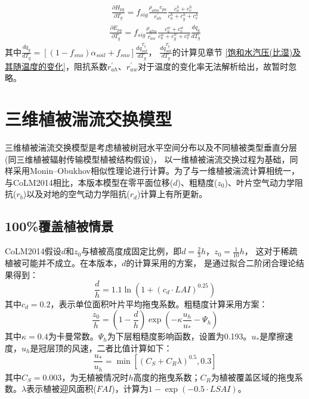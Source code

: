\begin{equation}
\begin{array}{c} \frac{\partial H_{p g}}{\partial T_{g}}=f_{sig} \frac{\rho_{atm} c_{p a}}{r_{a h}^{\prime}} 
     \frac{c_{a}^{h}+c_{v}^{h}}{c_{a}^{h}+c_{g}^{h}+c_{v}^{h}}\end{array}
\end{equation}
\begin{equation}
\begin{array}{c}\frac{\partial E_{p g}}{\partial T_{g}}=f_{sig}
      \frac{\rho_{atm}}{r_{a w}^{\prime}} \frac{c_{a}^{w}+c_{v}^{w}}{c_{a}^{w}+c_{g}^{w}+c_{v}^{w}} \frac{d q_{g}}{d T_{g}}\end{array}
\end{equation}
其中$\frac{dq_g}{dT_g}=\left[\left(1-f_{sno}\right)\alpha_{soil}+f_{sno}\right]\frac{dq_{sat}^{T_g}}{dT_g}$，
$\frac{dq_{sat}^{T_g}}{dT_g}$的计算见章节 \ref{饱和水汽压(比湿)及其随温度的变化}，阻抗系数$r_{ah}^\prime$、$r_{aw}^\prime$对于温度的变化率无法解析给出，故暂时忽略。


\section{三维植被湍流交换模型}
三维植被湍流交换模型是考虑植被树冠水平空间分布以及不同植被类型垂直分层(同三维植被辐射传输模型植被结构假设)，
以一维植被湍流交换过程为基础，同样采用Monin–Obukhov相似性理论进行计算。为了与一维植被湍流计算相统一，
与CoLM2014相比，本版本模型在零平面位移($d$)、粗糙度($z_0$)、叶片空气动力学阻抗($r_b$)以及对地的空气动力学阻抗($r_d$)计算上有所更新。
\subsection{100\%覆盖植被情景}
CoLM2014假设$d$和$z_0$与植被高度成固定比例，即$d=\frac{2}{3}h$，$z_0=\frac{1}{10}h$，
这对于稀疏植被可能并不成立\citep{zeng2007consistent}。在本版本，$d$的计算采用\citet{choudhury1988}的方案，
是通过拟合\citet{shaw1982aerodynamic}二阶闭合理论结果得到：
\begin{equation}\label{dOh}
\frac{d}{h}=1.1 \ln \left(1+\left(c_{d} \cdot LAI \right)^{0.25}\right)
\end{equation}
其中$c_d=0.2$，表示单位面积叶片平均拖曳系数。粗糙度计算采用\citet{raupach1992drag,raupach1994simplified}方案：
\begin{equation}\label{zOh}
\frac{z_{0}}{h}=\left(1-\frac{d}{h}\right) \exp \left(-\kappa \frac{u_{h}}{u_{*}}-\Psi_{h}\right)
\end{equation}
其中$\kappa=0.4$为卡曼常数。$\Psi_h$为下层粗糙度影响函数，设置为0.193。$u_\ast$是摩擦速度，$u_h$是冠层顶的风速，二者比值计算如下：
\begin{equation}\label{ustrarOuh}
\frac{u_{*}}{u_{h}}=\min \left[\left(C_{S}+C_{R} \lambda\right)^{0.5}, 0.3\right]
\end{equation}
其中$C_S=0.003$，为无植被情况时$h$高度的拖曳系数；$C_R$为植被覆盖区域的拖曳系数。$\lambda$表示植被迎风面积($FAI$)，计算为$1-\exp{\left(-0.5 \cdot LSAI\right)}$。


